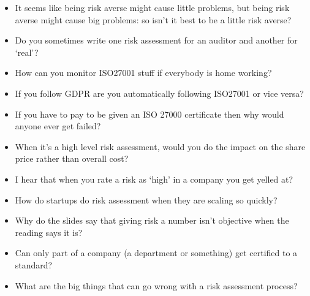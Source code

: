 \documentclass[12pt]{article}
\begin{document}
\begin{itemize}
  \item It seems like being risk averse might cause little problems, but being risk averse might cause big problems: so isn't it best to be a little risk averse?
  \item Do you sometimes write one risk assessment for an auditor and another for `real'?
  \item How can you monitor ISO27001 stuff if everybody is home working?
  \item If you follow GDPR are you automatically following ISO27001 or vice versa?
  \item If you have to pay to be given an ISO 27000 certificate then why would anyone ever get failed?
  \item When it's a high level risk assessment, would you do the impact on the share price rather than overall cost?
  \item I hear that when you rate a risk as `high' in a company you get yelled at?
  \item How do startups do risk assessment when they are scaling so quickly?
  \item Why do the slides say that giving risk a number isn't objective when the reading says it is?
  \item Can only part of a company (a department or something) get certified to a standard?
  \item What are the big things that can go wrong with a risk assessment process?
\end{itemize}







\end{document}
